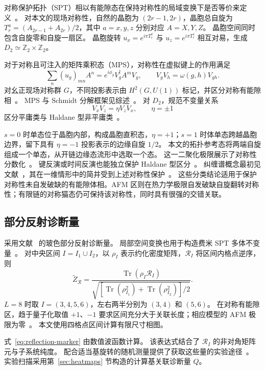 对称保护拓扑（SPT）相以有能隙态在保持对称性的局域变换下是否等价来定义~\cite{gu2009tensor,chen2010local}。
对本文的现场对称性，自然的晶胞为 $(2r-1,2r)$，晶胞总自旋为 $T_r^a=(A_{2r-1}+A_{2r})/2$，其中 $a=x,y,z$ 分别对应 $A=X,Y,Z$。
晶胞空间同时包含自旋零和自旋一扇区。
晶胞旋转 $u_x=e^{i\pi T_r^x}$ 与 $u_z=e^{i\pi T_r^z}$ 相互对易，生成 $D_2\simeq\mathbb Z_2\times\mathbb Z_2$。

对于对称且可注入的矩阵乘积态（MPS），对称性在虚拟键上的作用满足
\begin{equation}
\sum_n(u_g)_{mn}A^n=e^{i\phi_g}V_g^\dagger A^mV_g,
\qquad V_gV_h=\omega(g,h)V_{gh}.
\label{eq:mps-symmetry}
\end{equation}
对幺正现场对称群 $G$，不同投影表示由 $H^2(G,U(1))$ 标记，并区分对称有能隙相~\cite{chen2011classification,schuch2011classifying}。
MPS 与 Schmidt 分解框架见综述~\cite{schollwock2011density,cirac2021matrix}。
对 $D_2$，规范不变量关系
\begin{equation}
V_xV_z=\eta V_zV_x,\qquad \eta=\pm1
\label{eq:projective-index}
\end{equation}
区分平庸类与 Haldane 型非平庸类~\cite{pollmann2012detection}。

$s=0$ 时单态位于晶胞内部，构成晶胞直积态，$\eta=+1$；$s=1$ 时体单态跨越晶胞边界，留下具有 $\eta=-1$ 投影表示的边缘自旋 $1/2$。
本文的拓扑参考态将两端自旋组成一个单态，从开链边缘态流形中选取一个态。
这一二聚化极限展示了对称性分数化~\cite{verresen2017onedimensional}。
键反演或时间反演也能独立保护 Haldane 型区分~\cite{pollmann2012symmetry}。
纠缠谱概念最初见文献~\cite{li2008entanglement}，其在一维情形中的简并受到上述对称性保护~\cite{pollmann2010entanglement}。
这些分类结论适用于保护对称性未自发破缺的有能隙体相。AFM 区则在热力学极限自发破缺自旋翻转对称性；有限链的对称猫态仍可保持该对称性，同时具有很强的交错关联。

\subsection{部分反射诊断量}

采用文献~\cite{elben2020manybody} 的玻色部分反射诊断量。
局部空间变换也用于构造费米 SPT 多体不变量~\cite{shiozaki2017manybody}。
对中央区间 $I=I_1\cup I_2$，以 $\rho_I$ 表示约化密度矩阵，$\mathcal R_I$ 将区间内格点逆序，则
\begin{equation}
\tilde Z_{\mathcal R}
=\frac{\operatorname{Tr}(\rho_I\mathcal R_I)}
{\sqrt{\left[\operatorname{Tr}(\rho_{I_1}^2)
+\operatorname{Tr}(\rho_{I_2}^2)\right]/2}}.
\label{eq:reflection-marker}
\end{equation}
$L=8$ 时取 $I=(3,4,5,6)$，左右两半分别为 $(3,4)$ 和 $(5,6)$。
在对称有能隙区，趋于量子化取值 $+1$、$-1$ 要求区间充分大于关联长度；相应模型的 AFM 极限为零~\cite{elben2020manybody}。
本文使用四格点区间计算有限尺寸相图。

式~\eqref{eq:reflection-marker} 由数值波函数计算。
该表达式结合了 $\mathcal R_I$ 的非对角矩阵元与子系统纯度。
配合适当基旋转的随机测量提供了获取这些量的实验途径~\cite{elben2022toolbox}。
实验扫描采用第~\ref{sec:heatmaps} 节构造的计算基关联诊断量 $Q$。

